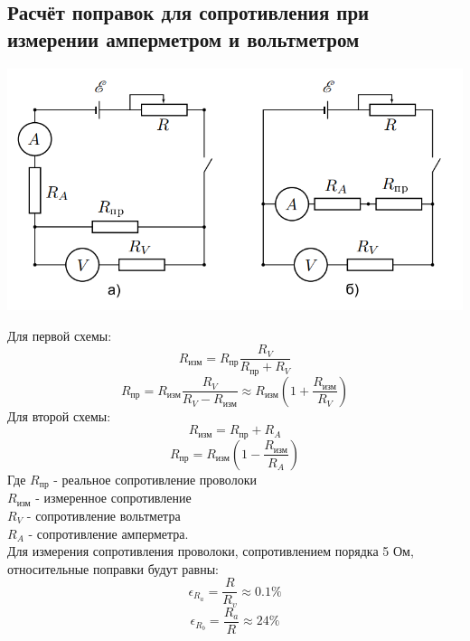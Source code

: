 \documentclass{article}
\begin{document}
\subsection{Расчёт поправок для сопротивления при измерении амперметром и вольтметром}\label{sec:app_2}

\begin{center}
    \includegraphics[width=\textwidth]{curcuits} \\
\end{center}
Для первой схемы:
$$R_{ \textrm{изм}} = R_{ \textrm{пр}}\frac{R_V}{R_{ \textrm{пр}} + R_V}$$
$$R_{ \textrm{пр}} = R_{ \textrm{изм}}\frac{R_V}{R_V - R_{ \textrm{изм}}} \approx R_{ \textrm{изм}}(1 + \frac{R_{ \textrm{изм}}}{R_V})$$
Для второй схемы:
$$R_{ \textrm{изм}} = R_{ \textrm{пр}} + R_A$$
$$R_{ \textrm{пр}} = R_{ \textrm{изм}}(1 - \frac{R_{ \textrm{изм}}}{R_A})$$
Где $R_{ \textrm{пр}}$ - реальное сопротивление проволоки\\
$R_{ \textrm{изм}}$ - измеренное сопротивление\\
$R_V$ - сопротивление вольтметра\\
$R_A$ - сопротивление амперметра.\\
Для измерения сопротивления проволоки, сопротивлением порядка 5 Ом, относительные поправки будут равны:
$$\epsilon_{R_a} = \frac{R}{R_v} \approx 0.1\%$$
$$\epsilon_{R_b} = \frac{R_a}{R} \approx 24\%$$
\end{document}
